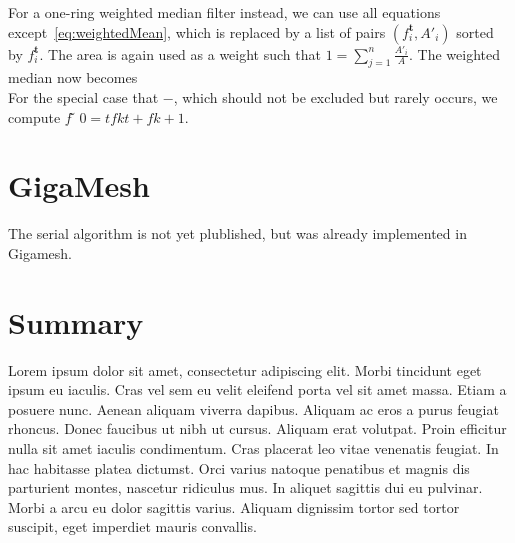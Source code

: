 For a one-ring weighted median filter instead, we can use all equations 
except~\ref{eq:weightedMean}, which is replaced by a list of pairs $(f_i^\mathbf{t}, 
A'_i)$ sorted by $f_i^\mathbf{t}$. The area is again used as a weight such that 
$1 = \displaystyle\sum_{j=1}^n\frac{A'_i}{A}$. The weighted median now becomes
\begin{equation}
\end{equation}
For the special case that $-$, which should not be excluded but rarely occurs, 
we compute $f  ̃ 0 =tf k t + f k+1$.~\cite[s.~3.2]{Mara17}



\section{GigaMesh}
The serial algorithm is not yet plublished, but was already implemented in Gigamesh.



\section{Summary}
Lorem ipsum dolor sit amet, consectetur adipiscing elit. Morbi tincidunt eget 
ipsum eu iaculis. Cras vel sem eu velit eleifend porta vel sit amet massa. Etiam 
a posuere nunc. Aenean aliquam viverra dapibus. Aliquam ac eros a purus feugiat 
rhoncus. Donec faucibus ut nibh ut cursus. Aliquam erat volutpat. Proin efficitur 
nulla sit amet iaculis condimentum. Cras placerat leo vitae venenatis feugiat. In 
hac habitasse platea dictumst. Orci varius natoque penatibus et magnis dis 
parturient montes, nascetur ridiculus mus. In aliquet sagittis dui eu pulvinar. 
Morbi a arcu eu dolor sagittis varius. Aliquam dignissim tortor sed tortor 
suscipit, eget imperdiet mauris convallis.
